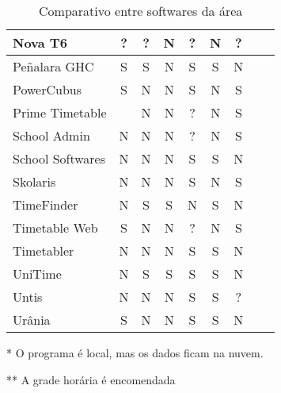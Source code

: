 \documentclass[12pt,a4paper]{article}
\begin{document}
\begin{table}[htb]
\begin{center}
\begin{threeparttable}
{\begin{tabular}{| l | c | c | c | c | c | c | c | c | }
							Nova T6             & ? & ? & N & ? & N & ? & \cite{rel_novat6}								\\ \hline %
							Peñalara GHC		& S & S & N & S & S & N & \cite{rel_penalara}							\\ \hline
							PowerCubus 	    	& S & N & N & S & N & S & \cite{rel_gridclass, rel_powercubus}			\\ \hline
							Prime Timetable     &   & N & N & ? & N & S & \cite{rel_primetimetable}						\\ \hline %
							School Admin		& N & N & N & ? & N & S & \cite{rel_schooladmin}						\\ \hline %
							School Softwares    & N & N & N & S & S & N & \cite{rel_schoolsoftwares} 					\\ \hline
							Skolaris			& N & N & N & S & N & S & \cite{rel_skolaris}							\\ \hline %
							TimeFinder          & N & S & S & N & S & N & \cite{rel_timefinder}							\\ \hline
							Timetable Web 	    & S & N & N & ? & N & S & \cite{rel_timetableweb} 						\\ \hline %
							Timetabler          & N & N & N & S & S & N & \cite{rel_timetabler} 						\\ \hline %
							UniTime  			& N & S & S & S & S & N & \cite{rel_unitime}  							\\ \hline %
							Untis 	 			& N & N & N & S & S & ? & \cite{rel_untis} 								\\ \hline %
							Urânia 		   	 	& S & N & N & S & S & N & \cite{rel_urania} 							\\ \hline %
						\end{tabular}
					}
					\caption{Comparativo entre softwares da área}
					\label{table:softwares}
					\footnotesize
					\begin{tablenotes}
						\item[*]{ O programa é local, mas os dados ficam na nuvem.}
						\item[**]{A grade horária é encomendada}
					\end{tablenotes}
				\end{threeparttable}
			\end{center}
		\end{table}
\end{document}
